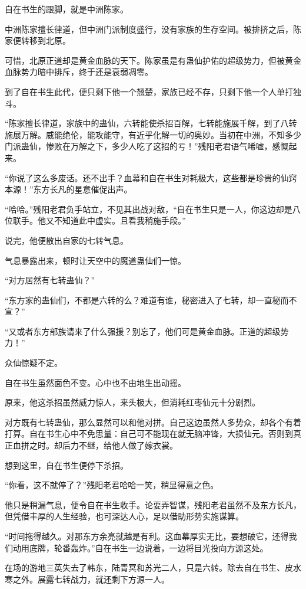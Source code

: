 \begin{this_body}
自在书生的跟脚，就是中洲陈家。

中洲陈家擅长律道，但中洲门派制度盛行，没有家族的生存空间。被排挤之后，陈家便转移到北原。

可惜，北原正道却是黄金血脉的天下。陈家虽是有蛊仙护佑的超级势力，但被黄金血脉势力暗中排斥，终于还是衰弱凋零。

到了自在书生此代，便只剩下他一个翘楚，家族已经不存，只剩下他一个人单打独斗。

“陈家擅长律道，家族中的蛊仙，六转能使杀招百解，七转能施展千解，到了八转施展万解。威能绝伦，能攻能守，有近乎化解一切的奥妙。当初在中洲，不知多少门派蛊仙，惨败在万解之下，多少人吃了这招的亏！”残阳老君语气唏嘘，感慨起来。

“你说了这么多废话。还不出手？血幕和自在书生对耗极大，这些都是珍贵的仙窍本源！”东方长凡的星意催促出声。

“哈哈。”残阳老君负手站立，不见其出战对敌，“自在书生只是一人，你这边却是八位联手。他又不知道此中虚实。且看我稍施手段。”

说完，他便散出自家的七转气息。

气息暴露出来，顿时让天空中的魔道蛊仙们一惊。

“对方居然有七转蛊仙？”

“东方家的蛊仙们，不都是六转的么？难道有谁，秘密进入了七转，却一直秘而不宣？”

“又或者东方部族请来了什么强援？别忘了，他们可是黄金血脉。正道的超级势力！”

众仙惊疑不定。

自在书生虽然面色不变。心中也不由地生出动摇。

原来，他这杀招虽然威力惊人，来头极大，但消耗红枣仙元十分剧烈。

对方既有七转蛊仙，那么显然可以和他对拼。自己这边虽然人多势众，却各个有着打算。自在书生心中不免思量：自己可不能现在就无脑冲锋，大损仙元。否则到真正血拼之时。却后力不继，给他人做了嫁衣裳。

想到这里，自在书生便停下杀招。

“你看，这不就停了？”残阳老君哈哈一笑，稍显得意之色。

他只是稍漏气息，便令自在书生收手。论耍弄智谋，残阳老君虽然不及东方长凡，但凭借丰厚的人生经验，也可深达人心，足以借助形势实施谋算。

“时间拖得越久。对那东方余亮就越是有利。这血幕厚实无比，要想破它，还得我们动用底牌，轮番轰炸。”自在书生一边说着，一边将目光投向方源这处。

在场的游地三英失去了韩东，陆青冥和苏光二人，只是六转。除去自在书生、皮水寒之外。展露七转战力，就还剩下方源一人。


\end{this_body}
